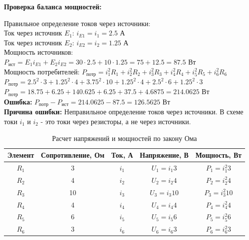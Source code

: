 \textbf{Проверка баланса мощностей:}
\begin{flushleft}
Правильное определение токов через источники: \\
Ток через источник $E_1$: $i_{E1} = i_1 = 2.5$ А \\
Ток через источник $E_2$: $i_{E2} = i_2 = 1.25$ А \\
Мощность источников: $P_{ист} = E_1 i_{E1} + E_2 i_{E2} = 30 \cdot 2.5 + 10 \cdot 1.25 = 75 + 12.5 = 87.5$ Вт \\
Мощность потребителей: $P_{потр} = i_1^2 R_1 + i_2^2 R_2 + i_3^2 R_3 + i_4^2 R_4 + i_5^2 R_5 + i_6^2 R_6$ \\
$P_{потр} = 2.5^2 \cdot 3 + 1.25^2 \cdot 4 + 3.75^2 \cdot 10 + 1.25^2 \cdot 4 + 2.5^2 \cdot 6 + 1.25^2 \cdot 3$ \\
$P_{потр} = 18.75 + 6.25 + 140.625 + 6.25 + 37.5 + 4.6875 = 214.0625$ Вт \\
\textbf{Ошибка:} $P_{потр} - P_{ист} = 214.0625 - 87.5 = 126.5625$ Вт \\
\textbf{Причина ошибки:} Неправильное определение токов через источники. В схеме токи $i_1$ и $i_2$ - это токи через резисторы, а не через источники.
\end{flushleft}
\begin{table}[H]
\centering
\begin{tabular}{|c|c|c|c|c|}
\hline
\textbf{Элемент} & \textbf{Сопротивление, Ом} & \textbf{Ток, А} & \textbf{Напряжение, В} & \textbf{Мощность, Вт} \\
\hline
$R_1$ & 3 & $i_1$ & $U_1 = i_1 3$ & $P_1 = i_1^2 3$ \\
\hline
$R_2$ & 4 & $i_2$ & $U_2 = i_2 4$ & $P_2 = i_2^2 4$ \\
\hline
$R_3$ & 10 & $i_3$ & $U_3 = i_3 10$ & $P_3 = i_3^2 10$ \\
\hline
$R_4$ & 4 & $i_4$ & $U_4 = i_4 4$ & $P_4 = i_4^2 4$ \\
\hline
$R_5$ & 6 & $i_5$ & $U_5 = i_5 6$ & $P_5 = i_5^2 6$ \\
\hline
$R_6$ & 3 & $i_6$ & $U_6 = i_6 3$ & $P_6 = i_6^2 3$ \\
\hline
\end{tabular}
\caption{Расчет напряжений и мощностей по закону Ома}
\label{tab:ohm_law_calculations}
\end{table}



